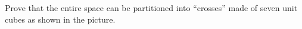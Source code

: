 Prove that the entire space can be partitioned into “crosses” made of seven unit cubes as shown in the picture.
